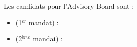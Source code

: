 \documentclass[a4paper,12pt]{CSLabs_AG_Candidatures_AB}
\date{} %
\begin{document}
	\thetitle

    Les candidats pour l'Advisory Board sont : 
    
    \vspace{10pt}
    
    \begin{itemize}[label=\textbullet]
        \setlength\itemsep{10pt}
    
        \item \textbf{} (1$^{er}$ mandat) : 

        \item \textbf{} (2$^{ème}$ mandat) : 
    
    \end{itemize}
	
\end{document}
